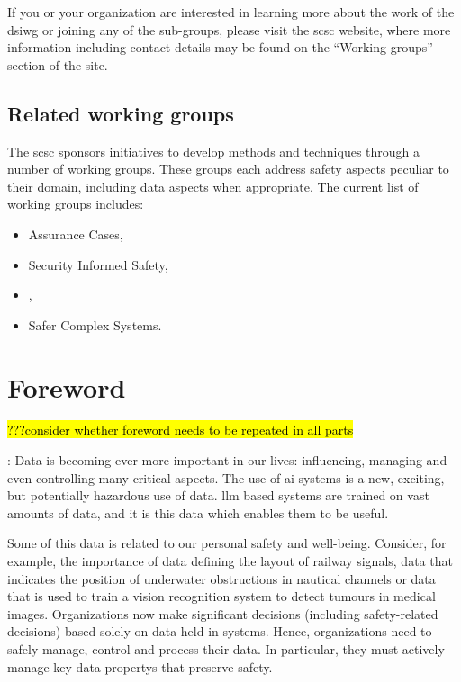If you or your organization are interested in learning more about the work of the \gls{dsiwg} or joining any of the sub-groups,
please visit the \gls{scsc} website, where more information including contact details may be found on the ``Working groups'' section of the site.
%
%
%
\subsection*{Related working groups}
The \gls{scsc} sponsors initiatives to develop methods and techniques through a number of working groups. These groups each address safety aspects peculiar to their domain, including data aspects when appropriate. The current list of working groups includes:
%
\begin{itemize}
  \item Assurance Cases,
\item Security Informed Safety,
  \item {},
  \item Safer Complex Systems. 
\end{itemize}
%
%
\clearpage
%

\makeatletter		%
\dsiwg@intblankpage
\makeatother

\pagestyle{FirstPageFrontMatter}
\section*{Foreword}\hl{???consider whether foreword needs to be repeated in all parts}


:
Data is becoming ever more important in our lives: influencing, managing and even controlling many critical aspects.
The use of \gls{ai} systems is a new, exciting, but potentially hazardous use of data. \Gls{llm} based systems are trained on vast amounts of data, and it is this data which enables them to be useful.

Some of this data is related to our personal safety and well-being.
Consider, for example, the importance of data defining the layout of railway signals,
data that indicates the position of underwater obstructions in nautical channels or data that
is used to train a vision recognition system to detect tumours in medical images.
Organizations now make significant decisions (including safety-related decisions) based solely on data held in systems.
Hence, organizations need to safely manage, control and process their data.
In particular, they must actively manage key \glspl{data property} that preserve safety.


